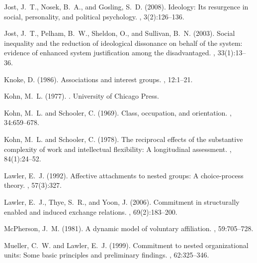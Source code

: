 \documentclass[12pt,letterpaper]{article}
\begin{document}
\begin{thebibliography}{}
Jost, J.~T., Nosek, B.~A., and Gosling, S.~D. (2008).
\newblock Ideology: Its resurgence in social, personality, and political
  psychology.
, 3(2):126--136.

Jost, J.~T., Pelham, B.~W., Sheldon, O., and Sullivan, B.~N. (2003).
\newblock Social inequality and the reduction of ideological dissonance on
  behalf of the system: evidence of enhanced system justification among the
  disadvantaged.
, 33(1):13--36.

Knoke, D. (1986).
\newblock Associations and interest groups.
, 12:1--21.

Kohn, M.~L. (1977).
.
\newblock University of Chicago Press.

Kohn, M.~L. and Schooler, C. (1969).
\newblock Class, occupation, and orientation.
, 34:659--678.

Kohn, M.~L. and Schooler, C. (1978).
\newblock The reciprocal effects of the substantive complexity of work and
  intellectual flexibility: A longitudinal assessment.
, 84(1):24--52.

Lawler, E.~J. (1992).
\newblock Affective attachments to nested groups: A choice-process theory.
, 57(3):327.

Lawler, E.~J., Thye, S.~R., and Yoon, J. (2006).
\newblock Commitment in structurally enabled and induced exchange relations.
, 69(2):183--200.

McPherson, J.~M. (1981).
\newblock A dynamic model of voluntary affiliation.
, 59:705--728.

Mueller, C.~W. and Lawler, E.~J. (1999).
\newblock Commitment to nested organizational units: Some basic principles and
  preliminary findings.
, 62:325--346.


\end{thebibliography}
\end{document}

